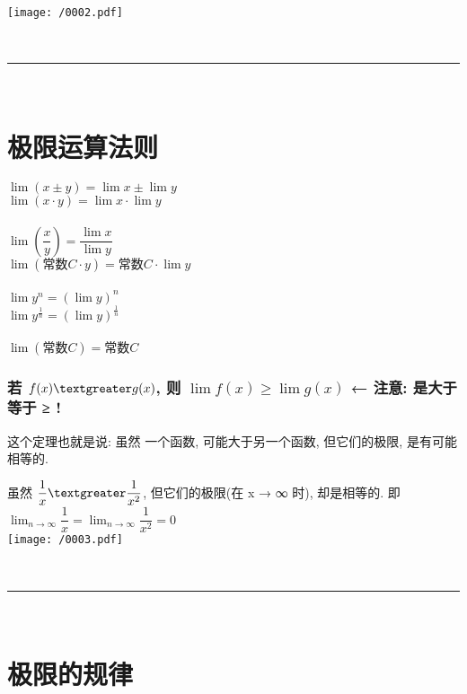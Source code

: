 \documentclass[UTF8]{ctexart}
\begin{document}
\texttt{[image: /0002.pdf]}

~\\
\hrule
~\\



\part{极限运算法则}

$ \lim (x \pm y) = \lim x \pm \lim y $ \\
$ \lim (x \cdot y) = \lim x \cdot \lim y $  \\
\\
$ \lim (\dfrac{x} {y}) = \dfrac{\lim x} {\lim y} $ \\
$ \lim (\text{常数} C \cdot y) = \text{常数} C \cdot \lim y $ \\
\\
$ \lim y^n = (\lim y)^n $ \\
$ \lim y^{\frac{1} {n}} = (\lim y)^{\frac{1} {n}} $ \\
\\
$ \lim(\text{常数}C) = \text{常数}C $
\\


\section{若 $ f(x) \textgreater g(x) $, 则 $ \lim f(x) \geq \lim g(x)$  ← 注意: 是大于等于 ≥ !}

这个定理也就是说: 虽然 一个函数, 可能大于另一个函数, 但它们的极限, 是有可能相等的. \\

\begin{tcolorbox}[title = {例},boxrule={0.1em},colframe={black!10}, colback={black!3},colbacktitle={black!10},coltitle={black}]
	虽然 $ \dfrac{1} {x} \textgreater \dfrac{1} {x^2}$, 但它们的极限(在 x → ∞ 时), 却是相等的.  即 $ \lim_{n\rightarrow \infty}\dfrac{1}{x}=\lim_{n\rightarrow \infty}\dfrac{1}{x^2}=0
	$ 
	\\
	
	\texttt{[image: /0003.pdf]}
\end{tcolorbox}



~\\
\hrule
~\\


\part{极限的规律}
\end{document}
